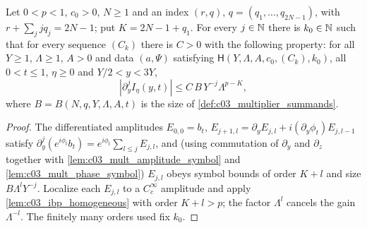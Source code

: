 \begin{lemma}
  \label{lem:c03_mult_parameter_ibp_bound}
  Let $0<p<1$, $c_0>0$, $N\ge1$ and an index $(r,q)$, $q=(q_1,\dots,q_{2N-1})$, with
  $r+\sum_jjq_j=2N-1$; put $K=2N-1+q_1$. For every $j\in\mathbb{N}$ there is $k_0\in\mathbb{N}$ such that for every
  sequence $(C_k)$ there is $C>0$ with the following property: for all $Y\ge1$, $\Lambda\ge1$, $A>0$ and
  data $(a,\Psi)$ satisfying $\mathsf H(Y,\Lambda,A,c_0,(C_k),k_0)$, all $0<t\le1$, $\eta\ge0$ and
  $Y/2<y<3Y$,
  \[
    |\partial_y^jI_\eta(y,t)|\le C\,B\,Y^{-j}\Lambda^{p-K},
  \]
  where $B=B(N,q,Y,\Lambda,A,t)$ is the size of \cref{def:c03_multiplier_summands}.
\end{lemma}
\begin{proof}
  The differentiated amplitudes $E_{0,0}=b_t$, $E_{j+1,l}=\partial_yE_{j,l}+i(\partial_y\phi_t)E_{j,l-1}$
  satisfy $\partial_y^j(e^{i\phi_t}b_t)=e^{i\phi_t}\sum_{l\le j}E_{j,l}$, and (using commutation of
  $\partial_y$ and $\partial_z$ together with \cref{lem:c03_mult_amplitude_symbol} and
  \cref{lem:c03_mult_phase_symbol}) $E_{j,l}$ obeys symbol bounds of order $K+l$ and size
  $B\Lambda^lY^{-j}$. Localize each $E_{j,l}$ to a $C^\infty_c$ amplitude and apply
  \cref{lem:c03_ibp_homogeneous} with order $K+l>p$; the factor $\Lambda^l$ cancels the gain
  $\Lambda^{-l}$. The finitely many orders used fix $k_0$.
\end{proof}

